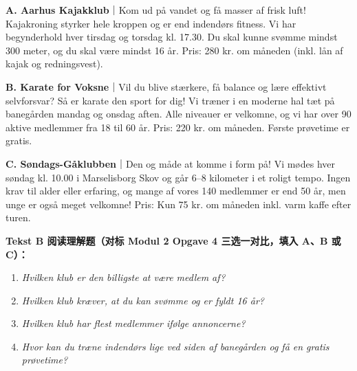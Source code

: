 \begin{tcolorbox}[enhanced, breakable, colback=NCDBgGray, colframe=NCDGray, coltitle=white, fonttitle=\bfseries, title={俱乐部广告对比阅读（A--C）}, arc=2pt, boxrule=0.8pt, borderline west={3pt}{0pt}{NCDTeal}, left=10pt, right=10pt, top=7pt, bottom=7pt]
\small
\textbf{A. Aarhus Kajakklub}｜Kom ud på vandet og få masser af frisk luft! Kajakroning styrker hele kroppen og er  end indendørs fitness. Vi har begynderhold hver tirsdag og torsdag kl. 17.30. Du skal kunne svømme mindst 300 meter, og du skal være mindst 16 år. Pris: 280 kr. om måneden (inkl. lån af kajak og redningsvest).

\vspace{0.35em}
\textbf{B. Karate for Voksne}｜Vil du blive stærkere, få  balance og lære effektivt selvforsvar? Så er karate den  sport for dig! Vi træner i en moderne hal tæt på banegården mandag og onsdag aften. Alle niveauer er velkomne, og vi har over 90 aktive medlemmer fra 18 til 60 år. Pris: 220 kr. om måneden. Første prøvetime er gratis.

\vspace{0.35em}
\textbf{C. Søndags-Gåklubben}｜Den  og  måde at komme i form på! Vi mødes hver søndag kl. 10.00 i Marselisborg Skov og går 6--8 kilometer i et roligt tempo. Ingen krav til alder eller erfaring, og mange af vores 140 medlemmer er  end 50 år, men unge er også meget velkomne! Pris: Kun 75 kr. om måneden inkl. varm kaffe efter turen.
\end{tcolorbox}

\textbf{Tekst B 阅读理解题（对标 Modul 2 Opgave 4 三选一对比，填入 A、B 或 C）：}
\begin{enumerate}
  \item \textit{Hvilken klub er den billigste at være medlem af?} \underline{\hspace{1.8cm}}
  \item \textit{Hvilken klub kræver, at du kan svømme og er fyldt 16 år?} \underline{\hspace{1.8cm}}
  \item \textit{Hvilken klub har flest medlemmer ifølge annoncerne?} \underline{\hspace{1.8cm}}
  \item \textit{Hvor kan du træne indendørs lige ved siden af banegården og få en gratis prøvetime?} \underline{\hspace{1.8cm}}
\end{enumerate}

